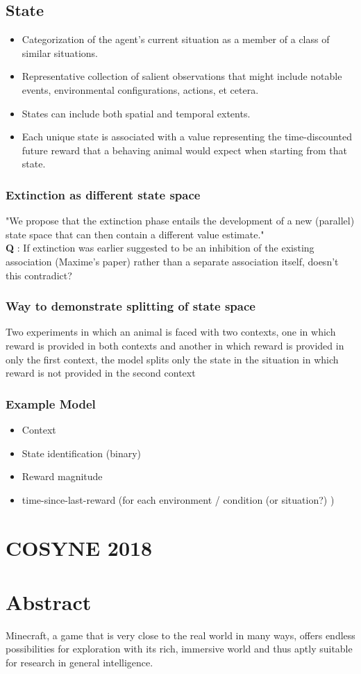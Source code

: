 \documentclass{article}
\begin{document}
\subsection{State}
\begin{itemize}
\item Categorization of the agent’s current situation as a member of a class of similar situations. 
\item Representative collection of salient observations that might include notable events, environmental configurations, actions, et cetera. 
\item States can include both spatial and temporal extents. 
\item Each unique state is associated with a value representing the time-discounted future reward that a behaving animal would expect when starting from that state.
\end{itemize}

\subsubsection{Extinction as different state space}
"We propose that the extinction phase entails the development of a new (parallel) state space that can then contain a different value estimate."\\
\textbf{Q} : If extinction was earlier suggested to be an inhibition of the existing association (Maxime's paper) rather than a separate association itself, doesn't this contradict?

\subsubsection{Way to demonstrate splitting of state space}
Two experiments in which an animal is faced with
two contexts, one in which reward is provided in both contexts and
another in which reward is provided in only the first context, the
model splits only the state in the situation in which reward is not
provided in the second context

\subsubsection{Example Model}
\begin{itemize}
\item Context 
\item State identification (binary)
\item Reward magnitude
\item time-since-last-reward (for each environment / condition (or situation?) )
\end{itemize}

\section{COSYNE 2018}

\section{Abstract}

Minecraft, a game that is very close to the real world in many ways, offers endless possibilities for exploration with its rich, immersive world and thus aptly suitable for research in general intelligence.   
\end{document}
